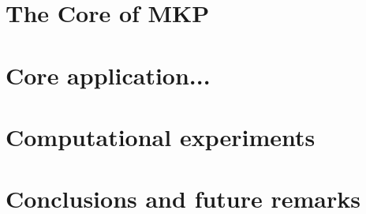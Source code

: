 \documentclass[10pt,conference, compsocconf]{IEEEtran}
\begin{document}
\section{The Core of MKP}
\label{sec:sce}


\section{Core application...}
\label{sec:sce}



\section{Computational experiments}
\label{sec:exp}



\section{Conclusions and future remarks}
\label{sec:conc}


%



\end{document}
